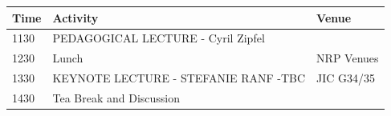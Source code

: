 \documentclass[12pt,]{book}
\theoremstyle{definition}
\theoremstyle{definition}
\theoremstyle{remark}
\begin{document}
\begin{longtable}[]{@{}lll@{}}
\toprule
\begin{minipage}[b]{0.09\columnwidth}\raggedright\strut
Time\strut
\end{minipage} & \begin{minipage}[b]{0.35\columnwidth}\raggedright\strut
Activity\strut
\end{minipage} & \begin{minipage}[b]{0.35\columnwidth}\raggedright\strut
Venue\strut
\end{minipage}\tabularnewline
\midrule
\endhead
\begin{minipage}[t]{0.09\columnwidth}\raggedright\strut
1130\strut
\end{minipage} & \begin{minipage}[t]{0.35\columnwidth}\raggedright\strut
PEDAGOGICAL LECTURE - Cyril Zipfel\strut
\end{minipage} & \begin{minipage}[t]{0.35\columnwidth}\raggedright\strut
\strut
\end{minipage}\tabularnewline
\begin{minipage}[t]{0.09\columnwidth}\raggedright\strut
1230\strut
\end{minipage} & \begin{minipage}[t]{0.35\columnwidth}\raggedright\strut
Lunch\strut
\end{minipage} & \begin{minipage}[t]{0.35\columnwidth}\raggedright\strut
NRP Venues\strut
\end{minipage}\tabularnewline
\begin{minipage}[t]{0.09\columnwidth}\raggedright\strut
1330\strut
\end{minipage} & \begin{minipage}[t]{0.35\columnwidth}\raggedright\strut
KEYNOTE LECTURE - STEFANIE RANF -TBC\strut
\end{minipage} & \begin{minipage}[t]{0.35\columnwidth}\raggedright\strut
JIC G34/35\strut
\end{minipage}\tabularnewline
\begin{minipage}[t]{0.09\columnwidth}\raggedright\strut
1430\strut
\end{minipage} & \begin{minipage}[t]{0.35\columnwidth}\raggedright\strut
Tea Break and Discussion\strut
\end{minipage} & \begin{minipage}[t]{0.35\columnwidth}\raggedright\strut

\end{minipage}
\end{longtable}
\end{document}
